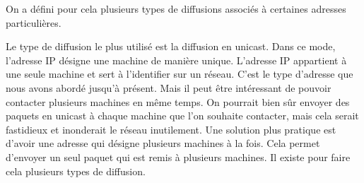 On a défini pour cela plusieurs types de diffusions associés à certaines adresses particulières.

Le type de diffusion le plus utilisé est la diffusion en unicast. Dans ce mode,
l'adresse IP désigne une machine de manière unique. L'adresse IP appartient
à une seule machine et sert à l'identifier sur un réseau.  C'est le type
d'adresse que nous avons abordé jusqu'à présent.  Mais il peut être intéressant
de pouvoir contacter plusieurs machines en même temps. On pourrait bien sûr
envoyer des paquets en unicast à chaque machine que l'on souhaite contacter,
mais cela serait fastidieux et inonderait le réseau inutilement. Une solution plus
pratique est d'avoir une adresse qui désigne plusieurs machines à la fois. Cela
permet d'envoyer un seul paquet qui est remis à plusieurs machines. Il
existe pour faire cela plusieurs types de diffusion.

